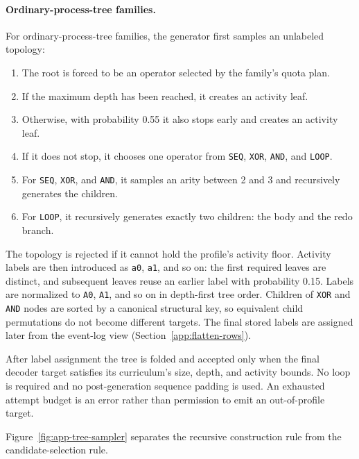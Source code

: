 \documentclass[manuscript,screen,nonacm]{acmart}
\begin{document}
\paragraph{Ordinary-process-tree families.}
For ordinary-process-tree families, the generator first samples an unlabeled topology:
\begin{enumerate}
  \item The root is forced to be an operator selected by the family's quota plan.
  \item If the maximum depth has been reached, it creates an activity leaf.
  \item Otherwise, with probability 0.55 it also stops early and creates an
        activity leaf.
  \item If it does not stop, it chooses one operator from \texttt{SEQ},
        \texttt{XOR}, \texttt{AND}, and \texttt{LOOP}.
  \item For \texttt{SEQ}, \texttt{XOR}, and \texttt{AND}, it samples an arity
        between 2 and 3 and recursively generates the children.
  \item For \texttt{LOOP}, it recursively generates exactly two children: the
        body and the redo branch.
\end{enumerate}
The topology is rejected if it cannot hold the profile's activity floor.
Activity labels are then introduced as \texttt{a0}, \texttt{a1}, and so on:
the first required leaves are distinct, and subsequent leaves reuse an earlier
label with probability 0.15. Labels are normalized to \texttt{A0},
\texttt{A1}, and so on in depth-first tree order. Children of \texttt{XOR} and
\texttt{AND} nodes are sorted by a canonical structural key, so equivalent
child permutations do not become different targets. The final stored labels
are assigned later from the event-log view (Section~\ref{app:flatten-rows}).

After label assignment the tree is folded and accepted only when the final
decoder target satisfies its curriculum's size, depth, and activity bounds.
No loop is required and no post-generation sequence padding is used. An
exhausted attempt budget is an error rather than permission to emit an
out-of-profile target.

Figure~\ref{fig:app-tree-sampler} separates the recursive construction rule
from the candidate-selection rule.
\end{document}
